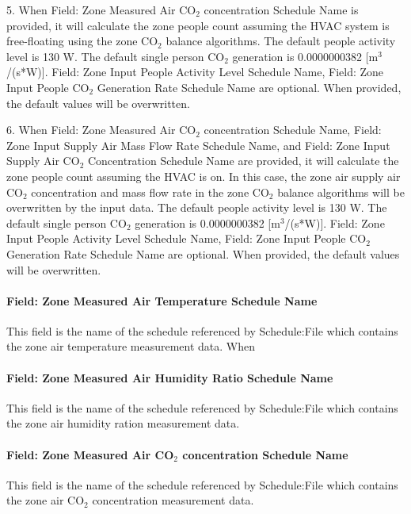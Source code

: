 5. When Field: Zone Measured Air CO$_2$ concentration Schedule Name is provided, it will calculate the zone people count assuming the HVAC system is free-floating using the zone CO$_2$ balance algorithms. The default people activity level is 130 W. The default single person CO$_2$ generation is 0.0000000382 [m$^3$/(s*W)]. Field: Zone Input People Activity Level Schedule Name, Field: Zone Input People CO$_2$ Generation Rate Schedule Name are optional. When provided, the default values will be overwritten.

6. When Field: Zone Measured Air CO$_2$ concentration Schedule Name, Field: Zone Input Supply Air Mass Flow Rate Schedule Name, and Field: Zone Input Supply Air CO$_2$ Concentration Schedule Name are provided, it will calculate the zone people count assuming the HVAC is on. In this case, the zone air supply air CO$_2$ concentration and mass flow rate in the zone CO$_2$ balance algorithms will be overwritten by the input data. The default people activity level is 130 W. The default single person CO$_2$ generation is 0.0000000382 [m$^3$/(s*W)]. Field: Zone Input People Activity Level Schedule Name, Field: Zone Input People CO$_2$ Generation Rate Schedule Name are optional. When provided, the default values will be overwritten.


\paragraph{Field: Zone Measured Air Temperature Schedule Name}\label{field-zone-measured-air-temperature-schedule-name-hm}
This field is the name of the schedule referenced by Schedule:File which contains the zone air temperature measurement data. When

\paragraph{Field: Zone Measured Air Humidity Ratio Schedule Name}\label{field-zone-measured-air-humidity-ratio-schedule-name-hm}
This field is the name of the schedule referenced by Schedule:File which contains the zone air humidity ration measurement data.

\paragraph{Field: Zone Measured Air CO$_2$ concentration Schedule Name}\label{field-zone-measured-air-co2-concentration-schedule-name-hm}
This field is the name of the schedule referenced by Schedule:File which contains the zone air CO$_2$ concentration measurement data.

